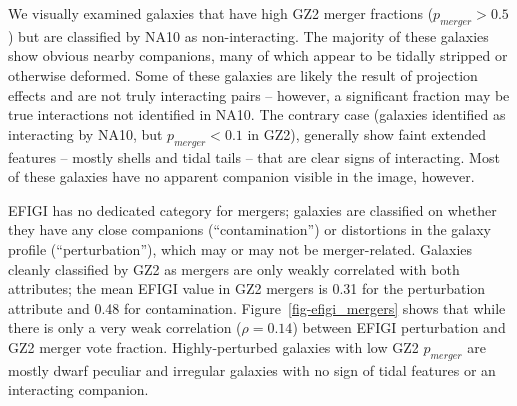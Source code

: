 \documentclass[useAMS,usenatbib]{mn2e}
\begin{document}
We visually examined galaxies that have high GZ2 merger fractions ($p_{merger}>0.5$) but are classified by NA10 as non-interacting. The majority of these galaxies show obvious nearby companions, many of which appear to be tidally stripped or otherwise deformed. Some of these galaxies are likely the result of projection effects and are not truly interacting pairs -- however, a significant fraction may be true interactions not identified in NA10. The contrary case (galaxies identified as interacting by NA10, but $p_{merger}<0.1$ in GZ2), generally show faint extended features -- mostly shells and tidal tails -- that are clear signs of interacting. Most of these galaxies have no apparent companion visible in the image, however.

%
%

EFIGI has no dedicated category for mergers; galaxies are classified on whether they have any close companions (``contamination'') or distortions in the galaxy profile (``perturbation''), which may or may not be merger-related. Galaxies cleanly classified by GZ2 as mergers are only weakly correlated with both attributes; the mean EFIGI value in GZ2 mergers is 0.31 for the perturbation attribute and 0.48 for contamination. Figure~\ref{fig-efigi_mergers} shows that while there is only a very weak correlation ($\rho=0.14$) between EFIGI perturbation and GZ2 merger vote fraction. Highly-perturbed galaxies with low GZ2 $p_{merger}$ are mostly dwarf peculiar and irregular galaxies with no sign of tidal features or an interacting companion. 
\end{document}
